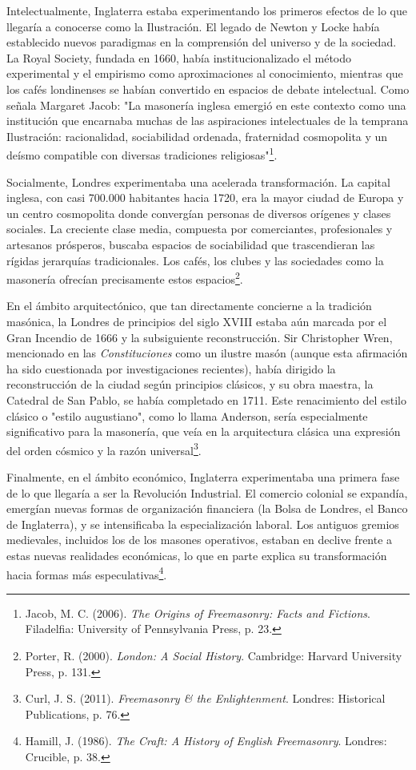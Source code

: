 \documentclass[a4paper,12pt,twoside]{book}
\begin{document}
Intelectualmente, Inglaterra estaba experimentando los primeros efectos de lo que llegaría a conocerse como la Ilustración. El legado de Newton y Locke había establecido nuevos paradigmas en la comprensión del universo y de la sociedad. La Royal Society, fundada en 1660, había institucionalizado el método experimental y el empirismo como aproximaciones al conocimiento, mientras que los cafés londinenses se habían convertido en espacios de debate intelectual. Como señala Margaret Jacob: "La masonería inglesa emergió en este contexto como una institución que encarnaba muchas de las aspiraciones intelectuales de la temprana Ilustración: racionalidad, sociabilidad ordenada, fraternidad cosmopolita y un deísmo compatible con diversas tradiciones religiosas"\footnote{Jacob, M. C. (2006). \textit{The Origins of Freemasonry: Facts and Fictions}. Filadelfia: University of Pennsylvania Press, p. 23.}.

Socialmente, Londres experimentaba una acelerada transformación. La capital inglesa, con casi 700.000 habitantes hacia 1720, era la mayor ciudad de Europa y un centro cosmopolita donde convergían personas de diversos orígenes y clases sociales. La creciente clase media, compuesta por comerciantes, profesionales y artesanos prósperos, buscaba espacios de sociabilidad que trascendieran las rígidas jerarquías tradicionales. Los cafés, los clubes y las sociedades como la masonería ofrecían precisamente estos espacios\footnote{Porter, R. (2000). \textit{London: A Social History}. Cambridge: Harvard University Press, p. 131.}.

En el ámbito arquitectónico, que tan directamente concierne a la tradición masónica, la Londres de principios del siglo XVIII estaba aún marcada por el Gran Incendio de 1666 y la subsiguiente reconstrucción. Sir Christopher Wren, mencionado en las \textit{Constituciones} como un ilustre masón (aunque esta afirmación ha sido cuestionada por investigaciones recientes), había dirigido la reconstrucción de la ciudad según principios clásicos, y su obra maestra, la Catedral de San Pablo, se había completado en 1711. Este renacimiento del estilo clásico o "estilo augustiano", como lo llama Anderson, sería especialmente significativo para la masonería, que veía en la arquitectura clásica una expresión del orden cósmico y la razón universal\footnote{Curl, J. S. (2011). \textit{Freemasonry \& the Enlightenment}. Londres: Historical Publications, p. 76.}.

Finalmente, en el ámbito económico, Inglaterra experimentaba una primera fase de lo que llegaría a ser la Revolución Industrial. El comercio colonial se expandía, emergían nuevas formas de organización financiera (la Bolsa de Londres, el Banco de Inglaterra), y se intensificaba la especialización laboral. Los antiguos gremios medievales, incluidos los de los masones operativos, estaban en declive frente a estas nuevas realidades económicas, lo que en parte explica su transformación hacia formas más especulativas\footnote{Hamill, J. (1986). \textit{The Craft: A History of English Freemasonry}. Londres: Crucible, p. 38.}.
\end{document}
